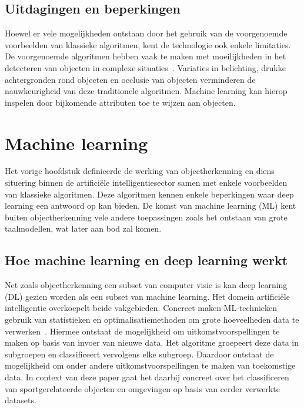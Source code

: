
\subsection{Uitdagingen en beperkingen}
\label{subsec:uitdagingen-en-beperkingen}
Hoewel er vele mogelijkheden ontstaan door het gebruik van de voorgenoemde voorbeelden van klassieke algoritmen, kent de technologie ook enkele limitaties.
De voorgenoemde algoritmen hebben vaak te maken met moeilijkheden in het detecteren van objecten in complexe situaties~\autocite{Luz2024}.
Variaties in belichting, drukke achtergronden rond objecten en occlusie van objecten verminderen de nauwkeurigheid van deze traditionele algoritmen.
Machine learning kan hierop inspelen door bijkomende attributen toe te wijzen aan objecten.



\section{Machine learning}\label{sec:datasets}
Het vorige hoofdstuk definieerde de werking van objectherkenning en diens situering binnen de artifici\"ele intelligentiesector samen met enkele voorbeelden van klassieke algoritmen.
Deze algoritmen kennen enkele beperkingen waar deep learning een antwoord op kan bieden.
De komst van machine learning (ML) kent buiten objectherkenning vele andere toepassingen zoals het ontstaan van grote taalmodellen, wat later aan bod zal komen.


\subsection{Hoe machine learning en deep learning werkt}
\label{subsec:hoe-deep-learning-werkt}
Net zoals objectherkenning een subset van computer visie is kan deep learning (DL) gezien worden als een subset van machine learning.
Het domein artifici\"ele intelligentie overkoepelt beide vakgebieden.
Concreet maken ML-technieken gebruik van statistieken en optimalisatiemethoden om grote hoeveelheden data te verwerken~\autocite{Pennone2024}.
Hiermee ontstaat de mogelijkheid om uitkomstvoorspellingen te maken op basis van invoer van nieuwe data.
Het algoritme groepeert deze data in subgroepen en classificeert vervolgens elke subgroep.
Daardoor ontstaat de mogelijkheid om onder andere uitkomstvoorspellingen te maken van toekomstige data.
In context van deze paper gaat het daarbij concreet over het classificeren van sportgerelateerde objecten en omgevingen op basis van eerder verwerkte datasets.

